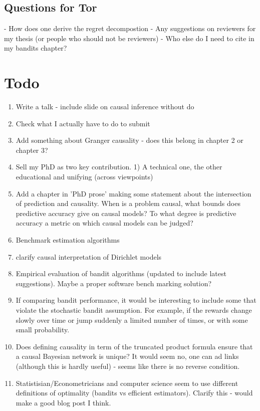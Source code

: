 


\section*{Questions for Tor}
- How does one derive the regret decompostion
- Any suggestions on reviewers for my thesis (or people who should not be reviewers)
- Who else do I need to cite in my bandits chapter?


\chapter*{Todo}
\begin{enumerate}
Clarify Cheng's Questions - is there a mechanical method to go from one framework to another, does it matter if variables are discrete or continuous. \todo{}

\item Write a talk - include slide on causal inference without do
\item Check what I actually have to do to submit
\item Add something about Granger causality - does this belong in chapter 2 or chapter 3?
\item Sell my PhD as two key contribution. 1) A technical one, the other educational and unifying (across viewpoints)
\item Add a chapter in 'PhD prose' making some statement about the intersection of prediction and causality. When is a problem causal, what bounds does predictive accuracy give on causal models? To what degree is predictive accuracy a metric on which causal models can be judged? 
\item Benchmark estimation algorithms
\item clarify causal interpretation of Dirichlet models
\item Empirical evaluation of bandit algorithms (updated to include latest suggestions). Maybe a proper software bench marking solution?
\item If comparing bandit performance, it would be interesting to include some that violate the stochastic bandit assumption. For example, if the rewards change slowly over time or jump suddenly a limited number of times, or with some small probability. 
\item Does defining causality in term of the truncated product formula ensure that a causal Bayesian network is unique? It would seem no, one can ad links (although this is hardly useful) - seems like there is no reverse condition. 
\item Statistisian/Econometricians and computer science seem to use different definitions of optimality (bandits vs efficient estimators). Clarify this - would make a good blog post I think. 
\end{enumerate}

